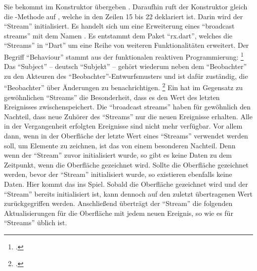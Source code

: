 Sie bekommt  im Konstruktor übergeben .
Daraufhin ruft der Konstruktor gleich die -Methode auf , welche in den Zeilen 15 bis 22 deklariert ist.
Darin wird der \enquote{Stream}   initialisiert.
Es handelt sich um eine Erweiterung eines \enquote{broadcast streams} mit dem Namen  .
Es entstammt dem Paket \enquote{rx.dart},
welches die \enquote{Streams} in \enquote{Dart} um eine Reihe von weiteren Funktionalitäten  erweitert.
Der Begriff \enquote{Behaviour} stammt aus der funktionalen reaktiven Programmierung:
\footcite[][S. 1]{ElliottHudak97:Fran}
Das \enquote{Subject}
-- deutsch \enquote{Subjekt} --
gehört wiederum neben dem \enquote{Beobachter} zu den Akteuren des \enquote{Beobachter}-Entwurfsmusters
und ist dafür zuständig, die \enquote{Beobachter} über Änderungen zu benachrichtigen.
\footcite[Vgl.][S. 288]{gamma2009entwurfsmuster} 
Ein  hat im Gegensatz zu gewöhnlichen \enquote{Streams} die Besonderheit,
dass es den Wert des letzten Ereignisses zwischenspeichert.
Die \enquote{broadcast streams} haben für gewöhnlich den Nachteil,
dass neue Zuhörer des \enquote{Streams} nur die neuen Ereignisse erhalten.
Alle in der Vergangenheit erfolgten Ereignisse sind nicht mehr verfügbar.
Vor allem dann,
wenn in der Oberfläche der letzte Wert eines \enquote{Streams} verwendet werden soll,
um Elemente zu zeichnen,
ist das von einem besonderen Nachteil.
Denn wenn der \enquote{Stream} zuvor initialisiert wurde,
so gibt es keine Daten zu dem Zeitpunkt,
wenn die Oberfläche gezeichnet wird.
Sollte die Oberfläche gezeichnet werden,
bevor der \enquote{Stream} initialisiert wurde,
so  existieren ebenfalls keine Daten.
Hier kommt das  ins Spiel.
Sobald die Oberfläche gezeichnet wird und der \enquote{Stream} bereits initialisiert ist,
kann dennoch auf den zuletzt übertragenen Wert zurückgegriffen werden.
Anschließend überträgt der \enquote{Stream} die folgenden Aktualisierungen für die Oberfläche mit jedem neuen Ereignis,
so wie es für \enquote{Streams} üblich ist.

